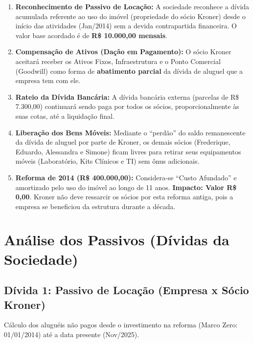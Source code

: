 \documentclass[12pt, a4paper]{article}
\newcommand{\reais}[1]{R\$ #1}
\begin{document}
\begin{enumerate}
    \item \textbf{Reconhecimento de Passivo de Locação:} A sociedade reconhece a dívida acumulada referente ao uso do imóvel (propriedade do sócio Kroner) desde o início das atividades (Jan/2014) sem a devida contrapartida financeira. O valor base acordado é de \textbf{\reais{10.000,00} mensais}.
    
    \item \textbf{Compensação de Ativos (Dação em Pagamento):} O sócio Kroner aceitará receber os Ativos Fixos, Infraestrutura e o Ponto Comercial (Goodwill) como forma de \textbf{abatimento parcial} da dívida de aluguel que a empresa tem com ele.
    
    \item \textbf{Rateio da Dívida Bancária:} A dívida bancária externa (parcelas de \reais{7.300,00}) continuará sendo paga por todos os sócios, proporcionalmente às suas cotas, até a liquidação final.
    
    \item \textbf{Liberação dos Bens Móveis:} Mediante o ``perdão'' do saldo remanescente da dívida de aluguel por parte de Kroner, os demais sócios (Frederique, Eduardo, Alessandra e Simone) ficam livres para retirar seus equipamentos móveis (Laboratório, Kits Clínicos e TI) sem ônus adicionais.

    \item \textbf{Reforma de 2014 (R\$ 400.000,00):} Considera-se ``Custo Afundado'' e amortizado pelo uso do imóvel ao longo de 11 anos. \textbf{Impacto: Valor R\$ 0,00}. Kroner não deve ressarcir os sócios por esta reforma antiga, pois a empresa se beneficiou da estrutura durante a década.

\end{enumerate}

\section{Análise dos Passivos (Dívidas da Sociedade)}

\subsection{Dívida 1: Passivo de Locação (Empresa x Sócio Kroner)}
Cálculo dos aluguéis não pagos desde o investimento na reforma (Marco Zero: 01/01/2014) até a data presente (Nov/2025).
\end{document}
